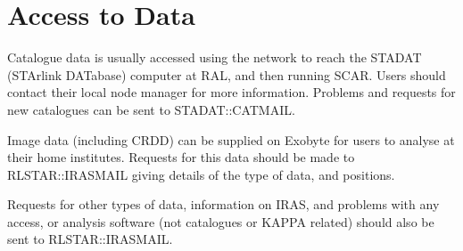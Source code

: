 \section{Access to Data}
Catalogue data is usually accessed using the network to reach the STADAT
(STArlink DATabase) computer at RAL, and then running SCAR.
Users should contact their local node manager for more information.
Problems and requests for new catalogues can be sent to STADAT::CATMAIL.

Image data (including CRDD) can be supplied on Exobyte for users to analyse at
their home institutes. Requests for this data should be made to RLSTAR::IRASMAIL
giving details of the type of data, and positions.

Requests for other types of data, information on IRAS, and problems with any
access, or analysis software (not catalogues or KAPPA related) should also
be sent to RLSTAR::IRASMAIL.


